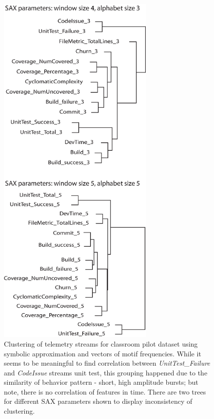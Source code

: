 \documentclass{sig-alternate}
\begin{document}
\begin{figure}[tp]
   \centering
   \includegraphics[height=180mm]{streams_clustering.eps}
   \caption{Clustering of telemetry streams for classroom pilot dataset using symbolic approximation and vectors of motif frequencies. While it seems to be meaningful to find correlation between \textit{UnitTest\_Failure} and \textit{CodeIssue} streams unit test, this grouping happened due to the similarity of behavior pattern - short, high amplitude bursts; but note, there is no correlation of features in time. There are two trees for different SAX parameters shown to display inconsistency of clustering.}
   \label{fig:cluster_streams}
\end{figure}
\end{document}
